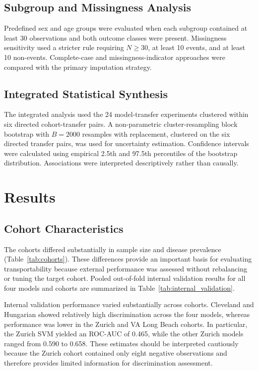 \documentclass[10pt,journal,twocolumn]{IEEEtran}
\begin{document}
\subsection{Subgroup and Missingness Analysis}

Predefined sex and age groups were evaluated when each subgroup contained at least 30 observations and both outcome classes were present. Missingness sensitivity used a stricter rule requiring $N\geq30$, at least 10 events, and at least 10 non-events. Complete-case and missingness-indicator approaches were compared with the primary imputation strategy.

\subsection{Integrated Statistical Synthesis}

The integrated analysis used the 24 model-transfer experiments clustered within six directed cohort-transfer pairs. A non-parametric cluster-resampling block bootstrap with $B=2000$ resamples with replacement, clustered on the six directed transfer pairs, was used for uncertainty estimation. Confidence intervals were calculated using empirical 2.5th and 97.5th percentiles of the bootstrap distribution. Associations were interpreted descriptively rather than causally.


\section{Results}

\subsection{Cohort Characteristics}

The cohorts differed substantially in sample size and disease prevalence (Table~\ref{tab:cohorts}). These differences provide an important basis for evaluating transportability because external performance was assessed without rebalancing or tuning the target cohort. Pooled out-of-fold internal validation results for all four models and cohorts are summarized in Table~\ref{tab:internal_validation}.

Internal validation performance varied substantially across cohorts. Cleveland and Hungarian showed relatively high discrimination across the four models, whereas performance was lower in the Zurich and VA Long Beach cohorts. In particular, the Zurich SVM yielded an ROC-AUC of 0.465, while the other Zurich models ranged from 0.590 to 0.658. These estimates should be interpreted cautiously because the Zurich cohort contained only eight negative observations and therefore provides limited information for discrimination assessment.
\end{document}
